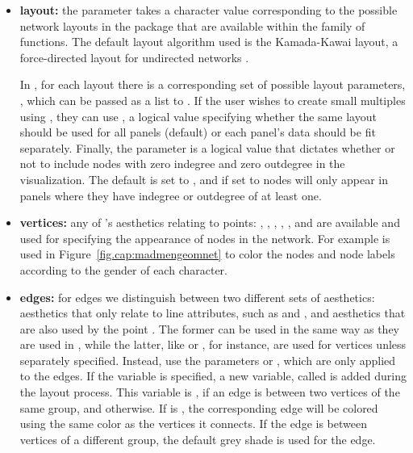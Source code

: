 \begin{itemize}
\item {\bf layout:}
the  parameter takes a character value corresponding to the possible network layouts in the  package that are available within the  family of functions.  The default layout algorithm used is the Kamada-Kawai layout, a force-directed layout for undirected networks \citep{kamadakawai}.

In , for each layout there is a corresponding set of possible layout parameters, , which can be passed as a list to . If the user wishes to create small multiples using  , they can use , a logical value specifying whether the same layout should be used for all panels (default) or each panel's data should be fit separately. Finally, the  parameter is a logical value that dictates whether or not to include nodes with zero indegree and zero outdegree in the visualization. The default is set to , and if set to  nodes will only appear in panels where they have indegree or outdegree of at least one. 
\item {\bf vertices:} any of 's aesthetics relating to points: , , , , , and  are available and used for specifying the appearance of nodes in the network. For example  is used in Figure~\ref{fig.cap:madmengeomnet} to color the nodes and node labels according to the gender of each character. 

\item {\bf edges:} for edges we distinguish between two different sets of aesthetics: aesthetics that only relate to line attributes, such as   and , and aesthetics that are also used by the point .  The former can be used in the same way as they are used in , while the latter, like  or , for instance, are used for vertices unless separately specified. Instead, use the parameters  or , which are only applied to the edges. If the  variable is specified, a new variable, called  is added during the layout process. This variable is , if an edge is between two vertices of the same group, and  otherwise. If  is , the corresponding edge will be colored using the same color as the vertices it connects. If the edge is between vertices of a different group, the default grey shade is used for the edge.


\end{itemize}
